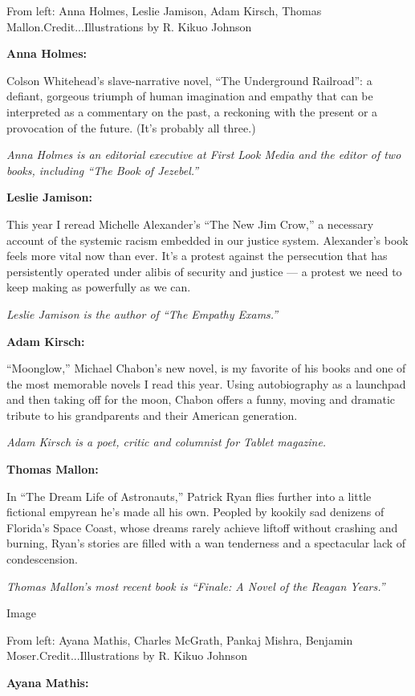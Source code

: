 From left: Anna Holmes, Leslie Jamison, Adam Kirsch, Thomas
Mallon.Credit...Illustrations by R. Kikuo Johnson

\textbf{Anna Holmes:}

Colson Whitehead's slave-narrative novel, ``The Underground Railroad'':
a defiant, gorgeous triumph of human imagination and empathy that can be
interpreted as a commentary on the past, a reckoning with the present or
a provocation of the future. (It's probably all three.)

\emph{Anna Holmes is an editorial executive at First Look Media and the
editor of two books, including ``The Book of Jezebel.''}

\textbf{Leslie Jamison:}

This year I reread Michelle Alexander's ``The New Jim Crow,'' a
necessary account of the systemic racism embedded in our justice system.
Alexander's book feels more vital now than ever. It's a protest against
the persecution that has persistently operated under alibis of security
and justice --- a protest we need to keep making as powerfully as we
can.

\emph{Leslie Jamison is the author of ``The Empathy Exams.''}

\textbf{Adam Kirsch:}

``Moonglow,'' Michael Chabon's new novel, is my favorite of his books
and one of the most memorable novels I read this year. Using
autobiography as a launchpad and then taking off for the moon, Chabon
offers a funny, moving and dramatic tribute to his grandparents and
their American generation.

\emph{Adam Kirsch is a poet, critic and columnist for Tablet magazine.}

\textbf{Thomas Mallon:}

In ``The Dream Life of Astronauts,'' Patrick Ryan flies further into a
little fictional empyrean he's made all his own. Peopled by kookily sad
denizens of Florida's Space Coast, whose dreams rarely achieve liftoff
without crashing and burning, Ryan's stories are filled with a wan
tenderness and a spectacular lack of condescension.

\emph{Thomas Mallon's most recent book is ``Finale: A Novel of the
Reagan Years.''}

Image

From left: Ayana Mathis, Charles McGrath, Pankaj Mishra, Benjamin
Moser.Credit...Illustrations by R. Kikuo Johnson

\textbf{Ayana Mathis:}

